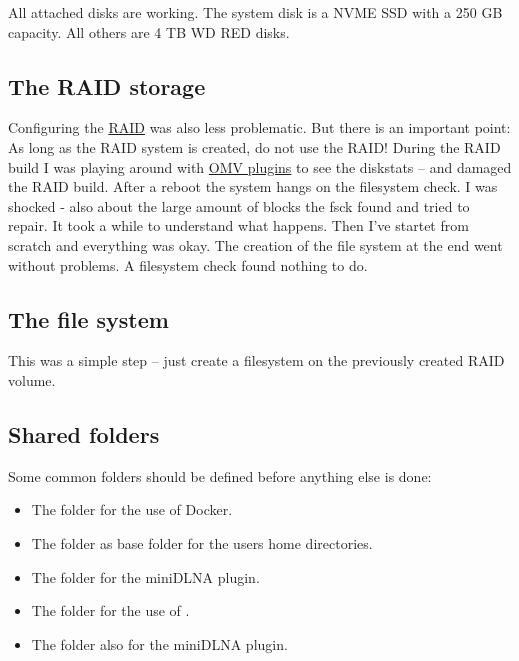 All attached disks are working. The system disk is a NVME SSD with a 250 GB
capacity. All others are 4 TB WD RED disks.


\subsection{The RAID storage}

Configuring the \href{https://en.wikipedia.org/wiki/RAID}{RAID} was also less
problematic. But there is an important point: As long as the RAID system is
created, do not use the RAID! During the RAID build I was playing around with
\href{https://www.openmediavault.org/?page_id=2014}{OMV plugins} to see the
diskstats -- and damaged the RAID build. After a reboot the system hangs on
the filesystem check. I was shocked - also about the large amount of blocks
the fsck found and tried to repair. It took a while to understand what happens.
Then I've startet from scratch and everything was okay. The creation of the
file system at the end went without problems. A filesystem check found nothing
to do.


\subsection{The file system}

This was a simple step -- just create a filesystem on the previously created
RAID volume.


\subsection{Shared folders}\label{subsec:Shared folders}

Some common folders should be defined before anything else is done:

\begin{itemize}
    \item The folder  for the use of \gls{Docker}.
    \item The folder  as base folder for the users home directories.
    \item The folder  for the miniDLNA plugin.
    \item The folder  for the use of .
    \item The folder  also for the miniDLNA plugin.
\end{itemize}

